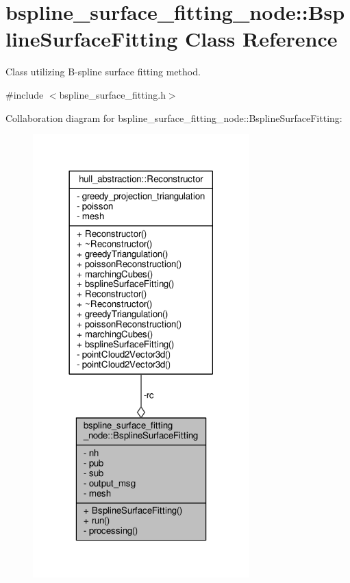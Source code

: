 \hypertarget{classbspline__surface__fitting__node_1_1_bspline_surface_fitting}{}\section{bspline\+\_\+surface\+\_\+fitting\+\_\+node\+:\+:Bspline\+Surface\+Fitting Class Reference}
\label{classbspline__surface__fitting__node_1_1_bspline_surface_fitting}


Class utilizing B-\/spline surface fitting method.  




{\ttfamily \#include $<$bspline\+\_\+surface\+\_\+fitting.\+h$>$}



Collaboration diagram for bspline\+\_\+surface\+\_\+fitting\+\_\+node\+:\+:Bspline\+Surface\+Fitting\+:\nopagebreak
\begin{figure}[H]
\begin{center}
\leavevmode
\includegraphics[width=237pt]{classbspline__surface__fitting__node_1_1_bspline_surface_fitting__coll__graph}
\end{center}
\end{figure}
